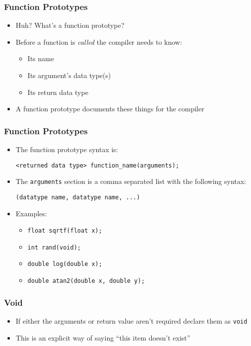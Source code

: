 \documentclass[14pt]{beamer}
\begin{document}
\begin{frame}
\frametitle{Function Prototypes}
\begin{itemize}
\item Huh? What's a function prototype?
\pause
\item Before a function is \textit{called} the compiler needs to know:
	\begin{itemize}
		\item Its name
		\item Its argument's data type(s)
		\item Its return data type 
	\end{itemize}
\pause
\item A function prototype documents these things for the compiler
\end{itemize}
\end{frame}

\begin{frame}[fragile]
\frametitle{Function Prototypes}
\begin{itemize}
\item The function prototype syntax is:
\begin{lstlisting}[style=CStyle]
<returned data type> function_name(arguments);
\end{lstlisting}
\pause
\item The \texttt{arguments} section is a comma separated list with the following syntax:
\begin{lstlisting}[style=CStyle]
(datatype name, datatype name, ...)
\end{lstlisting}
\item Examples:
	\begin{itemize}
		\item \texttt{float sqrtf(float x);}
		\item \texttt{int rand(void);}
		\item \texttt{double log(double x);}
		\item \texttt{double atan2(double x, double y);}
	\end{itemize}
\end{itemize}
\end{frame}

\begin{frame}
\frametitle{Void}
\begin{itemize}
\item If either the arguments or return value aren't required declare them as \texttt{void}
\item This is an explicit way of saying ``this item doesn't exist'' 
\end{itemize}
\end{frame}
\end{document}
